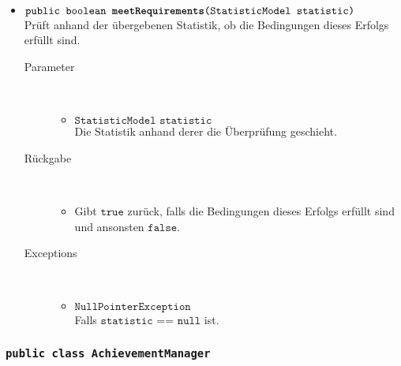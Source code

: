 \begin{description}
\begin{itemize}
				\item $\texttt{public boolean \textbf{meetRequirements}(StatisticModel statistic)}$ \\ Prüft anhand der übergebenen Statistik, ob die Bedingungen dieses Erfolgs erfüllt sind.
				\begin{description}
				\item[Parameter] \hfill \\
					\vspace{-.8cm}
					\begin{itemize}
						\item $\texttt{StatisticModel statistic}$ \\ Die Statistik anhand derer die Überprüfung geschieht. 
					\end{itemize}
					\item[Rückgabe] \hfill \\
					\vspace{-.8cm}
					\begin{itemize}
						\item Gibt $\texttt{true}$ zurück, falls die Bedingungen dieses Erfolgs erfüllt sind und ansonsten $\texttt{false}$.
					\end{itemize}
					\item[Exceptions] \hfill \\
					\vspace{-.8cm}
					\begin{itemize}
						\item $\texttt{NullPointerException}$ \\ Falls $\texttt{statistic == null}$ ist.
					\end{itemize}
				\end{description}
			\end{itemize}
		\end{description}
	
		\subsubsection{\normalfont \texttt{public class \textbf{AchievementManager}}}
		
